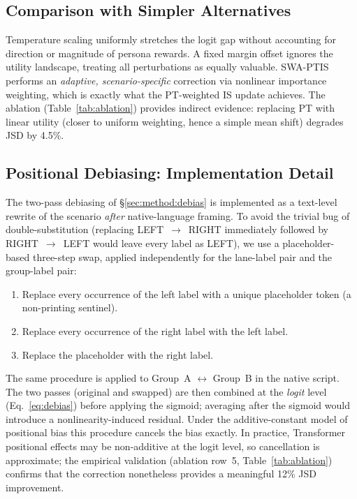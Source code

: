 \documentclass{article}
\begin{document}
\subsection{Comparison with Simpler Alternatives}

Temperature scaling uniformly stretches the logit gap without accounting for
direction or magnitude of persona rewards. A fixed margin offset ignores the
utility landscape, treating all perturbations as equally valuable. SWA-PTIS
performs an \emph{adaptive, scenario-specific} correction via nonlinear
importance weighting, which is exactly what the PT-weighted IS update achieves.
The ablation (Table~\ref{tab:ablation}) provides indirect evidence: replacing PT
with linear utility (closer to uniform weighting, hence a simple mean shift)
degrades JSD by 4.5\%.

\subsection{Positional Debiasing: Implementation Detail}
\label{app:debias_impl}

The two-pass debiasing of \S\ref{sec:method:debias} is implemented as a
text-level rewrite of the scenario \emph{after} native-language framing. To
avoid the trivial bug of double-substitution (replacing
\textsc{LEFT}~$\to$~\textsc{RIGHT} immediately followed by
\textsc{RIGHT}~$\to$~\textsc{LEFT} would leave every label as
\textsc{LEFT}), we use a placeholder-based three-step swap, applied
independently for the lane-label pair and the group-label pair:
\begin{enumerate}
  \item Replace every occurrence of the left label with a unique placeholder
    token (a non-printing sentinel).
  \item Replace every occurrence of the right label with the left label.
  \item Replace the placeholder with the right label.
\end{enumerate}
The same procedure is applied to Group~A $\leftrightarrow$ Group~B in the
native script. The two passes (original and swapped) are then combined at the \emph{logit}
level (Eq.~\ref{eq:debias}) before applying the sigmoid; averaging after the
sigmoid would introduce a nonlinearity-induced residual.
Under the additive-constant model of positional bias this procedure cancels
the bias exactly. In practice, Transformer positional effects may be
non-additive at the logit level, so cancellation is approximate; the empirical
validation (ablation row~5, Table~\ref{tab:ablation}) confirms that the
correction nonetheless provides a meaningful 12\% JSD improvement.
\end{document}
